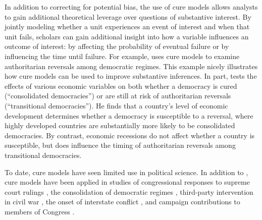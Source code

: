 In addition to correcting for potential bias, the use of cure models allows analysts to gain additional theoretical leverage over questions of substantive interest. By jointly modeling whether a unit experiences an event of interest and when that unit fails, scholars can gain additional insight into how a variable influences an outcome of interest: by affecting the probability of eventual failure or by influencing the time until failure.
For example, \citep{svolik2008} uses cure models to examine authoritarian reversals among democratic regimes. This example nicely illustrates how cure models can be used to improve substantive inferences. In part, \citep{svolik2008} tests the effects of various economic variables on both whether a democracy is cured (``consolidated democracies'') or are still at risk of authoritarian reversals (``transitional democracies''). He finds that a country's level of economic development determines whether a democracy is susceptible to a reversal, where highly developed countries are substantially more likely to be consolidated democracies. By contrast, economic recessions do not affect whether a country is susceptible, but does influence the timing of authoritarian reversals among transitional democracies. 

To date, cure models have seen limited use in political science. In addition to \citep{svolik2008}, cure models have been applied in studies of congressional responses to supreme court rulings \citep{hettinger2005}, the consolidation of democratic regimes \citep{svolik2008}, third-party intervention in civil war \citep{findley2006}, the onset of interstate conflict \citep{clark2003}, and campaign contributions to members of Congress \citep{box2005}.

